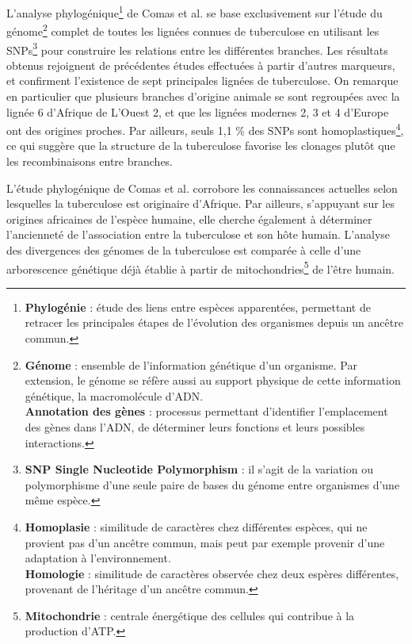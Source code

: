 \documentclass[twoside,a4paper,11pt,frenchb,openany]{report}
\begin{document}
L'analyse phylogénique\footnote{\textbf{Phylogénie} : étude des liens entre espèces apparentées, permettant de retracer les principales étapes de l'évolution des organismes depuis un ancêtre commun.} de Comas et al.\cite{comas} se base exclusivement sur l'étude du génome\footnote{\textbf{Génome} : ensemble de l'information génétique d'un organisme. Par extension, le génome se réfère aussi au support physique de cette information génétique, la macromolécule d'ADN.\\ \textbf{Annotation des gènes} : processus permettant d'identifier l'emplacement des gènes dans l'ADN, de déterminer leurs fonctions et leurs possibles interactions.} complet de toutes les lignées connues de tuberculose en utilisant les SNPs\footnote{\textbf{SNP Single Nucleotide Polymorphism} : il s'agit de la variation ou polymorphisme d'une seule paire de bases du génome entre organismes d'une même espèce.} pour construire les relations entre les différentes branches. Les résultats obtenus rejoignent de précédentes études effectuées à partir d'autres marqueurs, et confirment l'existence de sept principales lignées de tuberculose. On remarque en particulier que plusieurs branches d'origine animale se sont regroupées avec la lignée 6 d'Afrique de L'Ouest 2, et que les lignées modernes 2, 3 et 4 d'Europe ont des origines proches. Par ailleurs, seuls 1,1 \% des SNPs sont homoplastiques\footnote{\textbf{Homoplasie} : similitude de caractères chez différentes espèces, qui ne provient pas d'un ancêtre commun, mais peut par exemple provenir d'une adaptation à l'environnement.\\
\textbf{Homologie} : similitude de caractères observée chez deux espères différentes, provenant de l'héritage d'un ancêtre commun. }, ce qui suggère que la structure de la tuberculose favorise les clonages plutôt que les recombinaisons entre branches.  


L'étude phylogénique de Comas et al.\cite{comas} corrobore les connaissances actuelles selon lesquelles la tuberculose est originaire d'Afrique. Par ailleurs, s'appuyant sur les origines africaines de l'espèce humaine, elle cherche également à déterminer l'ancienneté de l'association entre la tuberculose et son hôte humain. L'analyse des divergences des génomes de la tuberculose est comparée à celle d'une arborescence génétique déjà établie à partir de mitochondries\footnote{\textbf{Mitochondrie} : centrale énergétique des cellules qui contribue à la production d'ATP.} de l'être humain. 
\end{document}
